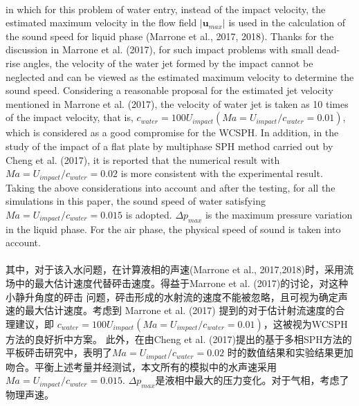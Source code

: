 \documentclass[UTF8]{ctexart}
\begin{document}
{{\paragraph{\quad}in which for this problem of water entry, instead of the 
                impact velocity, the estimated maximum velocity in the 
                flow field $|\mathbf{u}_{max}|$ is used in the calculation of the sound 
                speed for liquid phase (Marrone et al., 2017, 2018). 
                Thanks for the discussion in Marrone et al. (2017), 
                for such impact problems with small dead-rise angles, 
                the velocity of the water jet formed by the impact cannot 
                be neglected and can be viewed as the estimated maximum 
                velocity to determine the sound speed. Considering a 
                reasonable proposal for the estimated jet velocity mentioned 
                in Marrone et al. (2017), the velocity of water jet is taken as 
                10 times of the impact velocity, that is, $c_{water} = 100U_{impact} 
                (Ma = U_{impact}/c_{water} = 0.01)$, which is considered as a good 
                compromise for the WCSPH. In addition, in the study of the impact 
                of a flat plate by multiphase SPH method carried out by Cheng et al. 
                (2017), it is reported that the numerical result with 
                $Ma = U_{impact}/c_{water} = 0.02$ is more consistent with the experimental 
                result. Taking the above considerations into account and after the 
                testing, for all the simulations in this paper, the sound speed of water 
                satisfying $Ma = U_{impact}/c_{water} = 0.015$ is adopted. $\Delta p_{max}$ is the maximum 
                pressure variation in the liquid phase. For the air phase, the physical 
                speed of sound is taken into account.
\paragraph{\quad}其中，对于该入水问题，在计算液相的声速(Marrone et al., 2017,2018)时，采用流
                场中的最大估计速度代替砰击速度。得益于Marrone et al. (2017)的讨论，对这种小静升角度的砰击
                问题，砰击形成的水射流的速度不能被忽略，且可视为确定声速的最大估计速度。考虑到
                Marrone et al. (2017) 提到的对于估计射流速度的合理建议，即 $c_{water} = 100U_{impact} 
                (Ma = U_{impact}/c_{water} = 0.01)$，这被视为WCSPH方法的良好折中方案。
                此外，在由Cheng et al. (2017)提出的基于多相SPH方法的平板砰击研究中，表明了$Ma = U_{impact}/c_{water} = 0.02$
                时的数值结果和实验结果更加吻合。平衡上述考量并经测试，本文所有的模拟中的水声速采用 $Ma = U_{impact}/c_{water} = 0.015$.
                $\Delta p_{max}$是液相中最大的压力变化。对于气相，考虑了物理声速。 

}}
\end{document}
